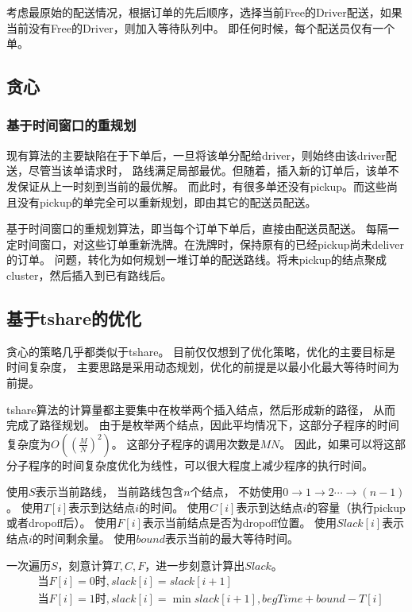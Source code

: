 \documentclass[hyperref,UTF8]{ctexart}
\theoremstyle{definition}
\theoremstyle{remark}
\numberwithin{equation}{subsection}
\begin{document}
考虑最原始的配送情况，根据订单的先后顺序，选择当前Free的Driver配送，如果当前没有Free的Driver，则加入等待队列中。
即任何时候，每个配送员仅有一个单。	

\subsection{贪心}
\label{subsec:greedy}

\subsubsection{基于时间窗口的重规划}

现有算法的主要缺陷在于下单后，一旦将该单分配给driver，则始终由该driver配送，尽管当该单请求时，
路线满足局部最优。但随着，插入新的订单后，该单不发保证从上一时刻到当前的最优解。
而此时，有很多单还没有pickup。而这些尚且没有pickup的单完全可以重新规划，即由其它的配送员配送。

基于时间窗口的重规划算法，即当每个订单下单后，直接由配送员配送。
每隔一定时间窗口，对这些订单重新洗牌。在洗牌时，保持原有的已经pickup尚未deliver的订单。
问题，转化为如何规划一堆订单的配送路线。将未pickup的结点聚成cluster，然后插入到已有路线后。

\subsection{基于tshare的优化}

贪心的策略几乎都类似于tshare。
目前仅仅想到了优化策略，优化的主要目标是时间复杂度，
主要思路是采用动态规划，优化的前提是以最小化最大等待时间为前提。

tshare算法的计算量都主要集中在枚举两个插入结点，然后形成新的路径，
从而完成了路径规划。
由于是枚举两个结点，因此平均情况下，这部分子程序的时间复杂度为$O((\frac{M}{N})^2)$。
这部分子程序的调用次数是$MN$。
因此，如果可以将这部分子程序的时间复杂度优化为线性，可以很大程度上减少程序的执行时间。

使用$S$表示当前路线，
当前路线包含$n$个结点，
不妨使用$0 \rightarrow 1 \rightarrow 2 \cdots \rightarrow (n-1)$。
使用$T[i]$表示到达结点$i$的时间。
使用$C[i]$表示到达结点$i$的容量（执行pickup或者dropoff后）。
使用$F[i]$表示当前结点是否为dropoff位置。
使用$Slack[i]$表示结点$i$的时间剩余量。
使用$bound$表示当前的最大等待时间。

一次遍历$S$，刻意计算$T,C,F$，进一步刻意计算出$Slack$。
\begin{align*}
	&\text{当} F[i]=0 \text{时}, slack[i] = slack[i+1]	\\
	&\text{当} F[i]=1 \text{时}, slack[i] = \min{slack[i+1], begTime+bound-T[i]}
\end{align*}
\end{document}
